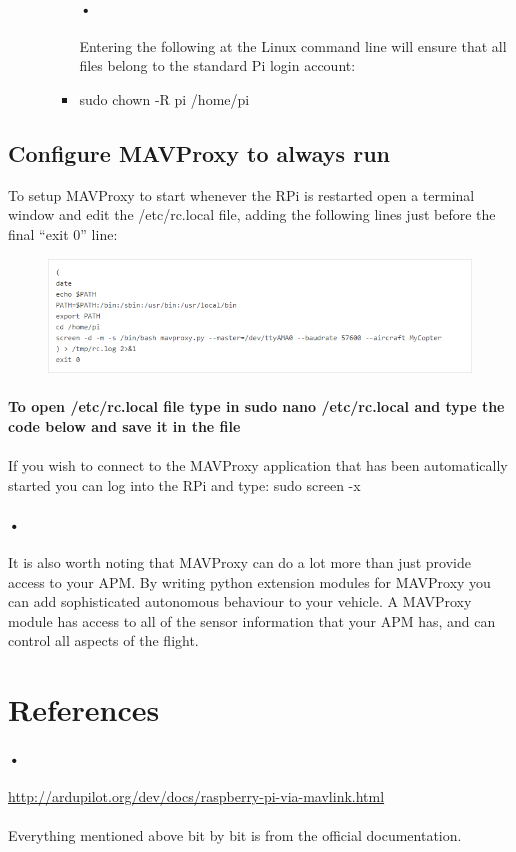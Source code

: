 \documentclass[11pt,a4paper]{article}
\begin{document}
\begin{itemize}
\begin{itemize}
\begin{itemize}
	\paragraph{•}Entering the following at the Linux command line will ensure that all files belong to the standard Pi login account:
	\item sudo chown -R pi /home/pi
		\end{itemize}
				\end{itemize}
				
			\end{itemize}
			\subsection{Configure MAVProxy to always run}
				To setup MAVProxy to start whenever the RPi is restarted open a terminal window and edit the /etc/rc.local file, adding the following lines just before the final “exit 0” line: 
				\begin{figure}[H]
	 	\centering
		\includegraphics[scale=0.75]{command}
		
\end{figure}
\paragraph{To open /etc/rc.local file type in sudo nano /etc/rc.local and type the code below and save it in the file}
\paragraph{}If you wish to connect to the MAVProxy application that has been automatically started you can log into the RPi and type: sudo screen -x
\paragraph{•}It is also worth noting that MAVProxy can do a lot more than just provide access to your APM. By writing python extension modules for MAVProxy you can add sophisticated autonomous behaviour to your vehicle. A MAVProxy module has access to all of the sensor information that your APM has, and can control all aspects of the flight.
	\section{References}
	\paragraph{•}
	\url{http://ardupilot.org/dev/docs/raspberry-pi-via-mavlink.html}
		
	\paragraph{}Everything mentioned above bit by bit is from the official documentation.
	
\end{document}
